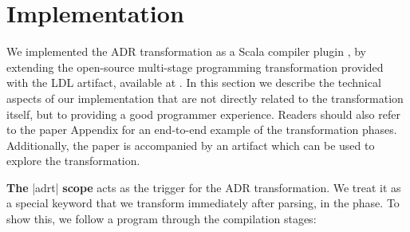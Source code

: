 \section{Implementation}
\label{sec:impl}


We implemented the ADR transformation as a Scala compiler plugin \cite{ildl-plugin}, by extending the open-source multi-stage programming transformation provided with the LDL \cite{ldl} artifact, available at \cite{ldl-staging-plugin}. In this section we describe the technical aspects of our implementation that are not directly related to the transformation itself, but to providing a good programmer experience. Readers should also refer to the paper Appendix for an end-to-end example of the transformation phases. Additionally, the paper is accompanied by an artifact which can be used to explore the transformation.



\vspace{0.3em}
\noindent \textbf{The} |adrt| \textbf{scope} acts as the trigger for the ADR transformation.
%
We treat it as a special keyword that we transform immediately after parsing, in the \postparser{} phase.
To show this, we follow a program through the compilation stages:

